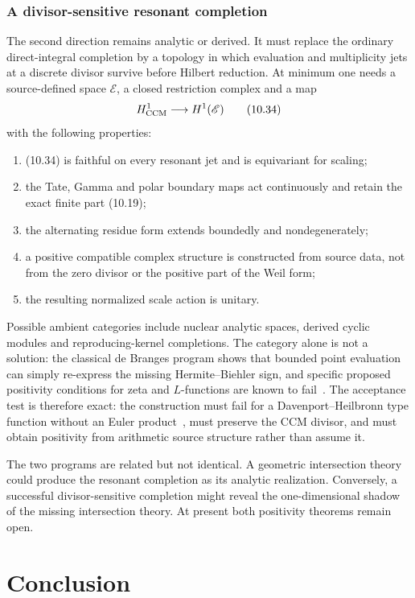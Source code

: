 \documentclass[11pt]{amsart}
\theoremstyle{definition}
\theoremstyle{remark}
\begin{document}
\subsubsection{A divisor-sensitive resonant completion}

The second direction remains analytic or derived.  It must replace the
ordinary direct-integral completion by a topology in which evaluation and
multiplicity jets at a discrete divisor survive before Hilbert reduction.
At minimum one needs a source-defined space \(\mathscr E\), a closed
restriction complex and a map
\[
 H^1_{\rm CCM}\longrightarrow H^1(\mathscr E)
 \tag{10.34}
\]
with the following properties:
\begin{enumerate}
\item (10.34) is faithful on every resonant jet and is equivariant for
scaling;
\item the Tate, Gamma and polar boundary maps act continuously and retain
the exact finite part (10.19);
\item the alternating residue form extends boundedly and nondegenerately;
\item a positive compatible complex structure is constructed from source
data, not from the zero divisor or the positive part of the Weil form;
\item the resulting normalized scale action is unitary.
\end{enumerate}
Possible ambient categories include nuclear analytic spaces, derived
cyclic modules and reproducing-kernel completions.  The category alone is
not a solution: the classical de Branges program shows that bounded point
evaluation can simply re-express the missing Hermite--Biehler sign, and
specific proposed positivity conditions for zeta and \(L\)-functions are
known to fail~\cite{deBranges1968,ConreyLi2000}.  The acceptance test is
therefore exact: the construction must fail for a Davenport--Heilbronn
type function without an Euler product~\cite{DavenportHeilbronn1936}, must preserve the CCM divisor, and
must obtain positivity from arithmetic source structure rather than assume
it.

The two programs are related but not identical.  A geometric intersection
theory could produce the resonant completion as its analytic realization.
Conversely, a successful divisor-sensitive completion might reveal the
one-dimensional shadow of the missing intersection theory.  At present
both positivity theorems remain open.

\section{Conclusion}
\end{document}
